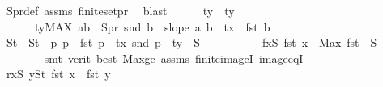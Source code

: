 \begin{isabellebody}
\ S{}pr{\isacharunderscore}{\kern0pt}def\ assms{\isacharparenleft}{\kern0pt}{}{\isacharparenright}{\kern0pt}\ finite{\isacharunderscore}{\kern0pt}set{\isacharunderscore}{\kern0pt}pr\ \isamarkupfalse%
\ blast\isanewline
\isanewline
\ \ \ \ \isamarkupfalse%
\ ty\ \ ty{\isacharcolon}{\kern0pt}\isanewline
\ \ \ \ \ \ {\isachardoublequoteopen}ty{\isacharequal}{\kern0pt}{\isacharparenleft}{\kern0pt}MAX\ {\isacharparenleft}{\kern0pt}a{\isacharcomma}{\kern0pt}b{\isacharparenright}{\kern0pt}\ {\isasymin}\ S{}pr{\isachardot}{\kern0pt}\ snd\ b\ {\isacharplus}{\kern0pt}\ {\isacharparenleft}{\kern0pt}slope\ a\ b{\isacharparenright}{\kern0pt}\ {\isacharasterisk}{\kern0pt}\ {\isacharparenleft}{\kern0pt}tx\ {\isacharminus}{\kern0pt}\ fst\ b{\isacharparenright}{\kern0pt}{\isacharparenright}{\kern0pt}\ {\isacharplus}{\kern0pt}\ {}{\isachardoublequoteclose}\isanewline
\ \ \ \ \isamarkupfalse%
\ S{}t\ \ {\isachardoublequoteopen}S{}t\ {\isacharequal}{\kern0pt}\ {\isacharparenleft}{\kern0pt}{\isasymlambda}p{\isachardot}{\kern0pt}\ p\ {\isacharplus}{\kern0pt}\ {\isacharparenleft}{\kern0pt}{\isacharminus}{\kern0pt}fst\ p{}\ {\isacharplus}{\kern0pt}\ tx{\isacharcomma}{\kern0pt}\ {\isacharminus}{\kern0pt}snd\ p{}\ {\isacharplus}{\kern0pt}\ ty{\isacharparenright}{\kern0pt}{\isacharparenright}{\kern0pt}\ {\isacharbackquote}{\kern0pt}\ S{}{\isachardoublequoteclose}\isanewline
\ \ \ \ \isanewline
\ \ \ \ \isamarkupfalse%
\ f{}{\isacharcolon}{\kern0pt}{\isachardoublequoteopen}{\isacharparenleft}{\kern0pt}{\isasymforall}x{\isasymin}S{}{\isachardot}{\kern0pt}\ fst\ x\ {\isacharless}{\kern0pt}\ Max\ {\isacharparenleft}{\kern0pt}fst\ {\isacharbackquote}{\kern0pt}\ S{}{\isacharparenright}{\kern0pt}\ {\isacharplus}{\kern0pt}\ {}{\isacharparenright}{\kern0pt}{\isachardoublequoteclose}\isanewline
\ \ \ \ \ \ \isamarkupfalse%
\ {\isacharparenleft}{\kern0pt}smt\ {\isacharparenleft}{\kern0pt}verit{\isacharcomma}{\kern0pt}\ best{\isacharparenright}{\kern0pt}\ Max{\isacharunderscore}{\kern0pt}ge\ assms\ finite{\isacharunderscore}{\kern0pt}imageI\ image{\isacharunderscore}{\kern0pt}eqI{\isacharparenright}{\kern0pt}\isanewline
\ \ \ \ \isamarkupfalse%
\ r{}{\isacharcolon}{\kern0pt}{\isachardoublequoteopen}{\isacharparenleft}{\kern0pt}{\isasymforall}x{\isasymin}S{}{\isachardot}{\kern0pt}\ {\isasymforall}y{\isasymin}S{}t{\isachardot}{\kern0pt}\ fst\ x\ {\isacharless}{\kern0pt}\ fst\ y{\isacharparenright}{\kern0pt}{\isachardoublequoteclose}\ \isamarkupfalse%

\end{isabellebody}
